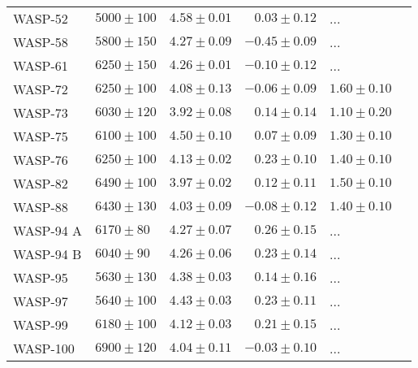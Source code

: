 \documentclass[fleqn]{fcup-thesis}
\newcommand{\object}[1]{#1}
\begin{document}
\begin{landscape}
\begin{longtable}{lllrll}
      \object{WASP-52}         &    $5000 \pm 100$   &    $4.58 \pm 0.01$   &    $ 0.03 \pm 0.12$   &          ...         &    \citet{Hebrard2013}      \\
      \object{WASP-58}         &    $5800 \pm 150$   &    $4.27 \pm 0.09$   &    $-0.45 \pm 0.09$   &          ...         &    \citet{Hebrard2013}      \\
      \object{WASP-61}         &    $6250 \pm 150$   &    $4.26 \pm 0.01$   &    $-0.10 \pm 0.12$   &          ...         &    \citet{Hellier2012}      \\
      \object{WASP-72}         &    $6250 \pm 100$   &    $4.08 \pm 0.13$   &    $-0.06 \pm 0.09$   &    $1.60 \pm 0.10$   &    \citet{Gillon2013}       \\
      \object{WASP-73}         &    $6030 \pm 120$   &    $3.92 \pm 0.08$   &    $ 0.14 \pm 0.14$   &    $1.10 \pm 0.20$   &    \citet{Delrez2014}       \\
      \object{WASP-75}         &    $6100 \pm 100$   &    $4.50 \pm 0.10$   &    $ 0.07 \pm 0.09$   &    $1.30 \pm 0.10$   &    \citet{Gomez2013}        \\
      \object{WASP-76}         &    $6250 \pm 100$   &    $4.13 \pm 0.02$   &    $ 0.23 \pm 0.10$   &    $1.40 \pm 0.10$   &    \citet{West2016}         \\
      \object{WASP-82}         &    $6490 \pm 100$   &    $3.97 \pm 0.02$   &    $ 0.12 \pm 0.11$   &    $1.50 \pm 0.10$   &    \citet{West2016}         \\
      \object{WASP-88}         &    $6430 \pm 130$   &    $4.03 \pm 0.09$   &    $-0.08 \pm 0.12$   &    $1.40 \pm 0.10$   &    \citet{Delrez2014}       \\
      \object{WASP-94 A}       &    $6170 \pm  80$   &    $4.27 \pm 0.07$   &    $ 0.26 \pm 0.15$   &          ...         &   \citet{Neveu2014}         \\
      \object{WASP-94 B}       &    $6040 \pm  90$   &    $4.26 \pm 0.06$   &    $ 0.23 \pm 0.14$   &          ...         &   \citet{Neveu2014}         \\
      \object{WASP-95}         &    $5630 \pm 130$   &    $4.38 \pm 0.03$   &    $ 0.14 \pm 0.16$   &          ...         &    \citet{Hellier2014}      \\
      \object{WASP-97}         &    $5640 \pm 100$   &    $4.43 \pm 0.03$   &    $ 0.23 \pm 0.11$   &          ...         &    \citet{Hellier2014}      \\
      \object{WASP-99}         &    $6180 \pm 100$   &    $4.12 \pm 0.03$   &    $ 0.21 \pm 0.15$   &          ...         &    \citet{Hellier2014}      \\
      \object{WASP-100}        &    $6900 \pm 120$   &    $4.04 \pm 0.11$   &    $-0.03 \pm 0.10$   &          ...         &    \citet{Hellier2014}      \\
  \end{longtable}
\end{landscape}
\end{document}
